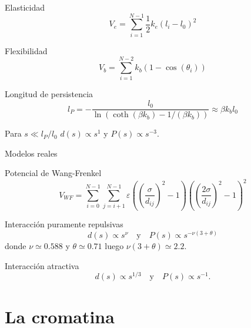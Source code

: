 \documentclass{beamer}
\begin{document}
\begin{frame}
    \begin{block}{Elasticidad}
        \begin{equation}
            V_e=\sum_{i=1}^{N-1}\frac{1}{2}k_e(l_i-l_0)^2
        \end{equation}
    \end{block}
    \begin{block}{Flexibilidad}
        \begin{equation}
            V_b=\sum_{i=1}^{N-2} k_b (1-\cos(\theta_i))
        \end{equation}
    \end{block}
    \begin{block}{Longitud de persistencia}
        \begin{equation}
            l_P=-\frac{l_0}{\ln(\coth(\beta k_b)-1/(\beta k_b))}\approx\beta k_bl_0
        \end{equation}
    \end{block}
    Para $s\ll l_P/l_0$ $d(s)\propto s^{1}$ y $P(s)\propto s^{-3}$.
\end{frame}

\begin{frame}{Modelos reales}
    \begin{block}{Potencial de Wang-Frenkel}
        \begin{equation}
            V_{WF}=\sum_{i=0}^{N-1}\sum_{j=i+1}^{N-1}\varepsilon\left(\left(\frac{\sigma}{d_{ij}}\right)^{2}-1\right)\left(\left(\frac{2\sigma}{d_{ij}}\right)^{2}-1\right)^{2}
        \end{equation}
    \end{block}
    \begin{block}{Interacción puramente repulsivas}
        \begin{equation}
            d(s)\propto s^{\nu}  \quad \text{y} \quad P(s)\propto s^{-\nu(3+\theta)}
        \end{equation}
        donde $\nu\simeq0.588$ y $\theta\simeq0.71$ luego $\nu(3+\theta)\simeq2.2$.
    \end{block}
    \begin{block}{Interacción atractiva}
        \begin{equation}
            d(s)\propto s^{1/3}  \quad \text{y} \quad P(s)\propto s^{-1}.
        \end{equation}
    \end{block}
\end{frame}

\section{La cromatina}
\end{document}
